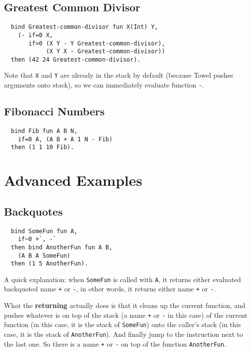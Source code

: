 \documentclass{book}
\begin{document}
\subsection{Greatest Common Divisor}
\begin{verbatim}
  bind Greatest-common-divisor fun X(Int) Y,
    (- if=0 X,
       if>0 (X Y - Y Greatest-common-divisor),
            (X Y X - Greatest-common-divisor))
  then (42 24 Greatest-common-divisor).
\end{verbatim}

Note that \texttt{X} and \texttt{Y} are already in the stack by default (because Towel pushes arguments onto stack), so we can immediately evaluate function \texttt{-}.

\subsection{Fibonacci Numbers}
\begin{verbatim}
  bind Fib fun A B N,
    if=0 A, (A B + A 1 N - Fib)
  then (1 1 10 Fib).
\end{verbatim}

\section{Advanced Examples}

\subsection{Backquotes}
\label{ssec:backquote}
\begin{verbatim}
  bind SomeFun fun A,
    if~0 +`, -`
  then bind AnotherFun fun A B,
    (A B A SomeFun)
  then (1 5 AnotherFun).
\end{verbatim}

A quick explanation: when \texttt{SomeFun} is called with \texttt{A}, it returns either evaluated backquoted name \texttt{+} or \texttt{-}, in other words, it returns either name \texttt{+} or \texttt{-}.

What the \textbf{returning} actually does is that it cleans up the current function, and pushes whatever is on top of the stack (a name \texttt{+} or \texttt{-} in this case) of the current function (in this case, it is the stack of \texttt{SomeFun}) onto the caller's stack (in this case, it is the stack of \texttt{AnotherFun}). And finally jump to the instruction next to the last one. So there is a name \texttt{+} or \texttt{-} on top of the function \texttt{AnotherFun}.
\end{document}
